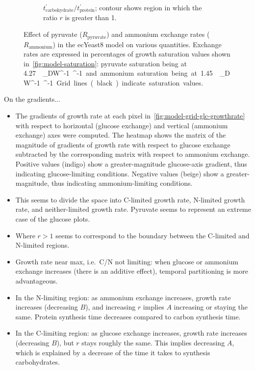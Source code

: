 \begin{figure}
\begin{subfigure}[t]{0.45\textwidth}
    \caption{
      $t_{\mathrm{carbohydrate}}^{\prime}/t_{\mathrm{protein}}^{\prime}$;
      contour shows region in which the ratio $r$ is greater than 1.
    }
    \label{fig:model-grid-pyr-carb-to-prot}
  \end{subfigure}
  \caption{
    Effect of pyruvate ($R_{\mathrm{pyruvate}}$) and ammonium exchange rates ($R_{{\mathrm{ammonium}}}$) in the ecYeast8 model on various quantities.
    Exchange rates are expressed in percentages of growth saturation values shown in~\ref{fig:model-saturation}: pyruvate saturation being at \SI{4.27}{\milli\mole~\gram_{DW}^{-1}~\hour^{-1}} and ammonium saturation being at \SI{1.45}{\milli\mole~\gram_{DW}^{-1}~\hour^{-1}}.
    Grid lines (black) indicate saturation values.
  }
  \label{fig:model-grid-pyr}
\end{figure}

On the gradients...
\begin{itemize}
  \item The gradients of growth rate at each pixel in~\ref{fig:model-grid-glc-growthrate} with respect to horizontal (glucose exchange) and vertical (ammonium exchange) axes were computed.
        The heatmap shows the matrix of the magnitude of gradients of growth rate with respect to glucose exchange subtracted by the corresponding matrix with respect to ammonium exchange.
        Positive values (indigo) show a greater-magnitude glucose-axis gradient, thus indicating glucose-limiting conditions.
        Negative values (beige) show a greater-magnitude, thus indicating ammonium-limiting conditions.
  \item This seems to divide the space into C-limited growth rate, N-limited growth rate, and neither-limited growth rate.
        Pyruvate seems to represent an extreme case of the glucose plots.
  \item Where $r > 1$ seems to correspond to the boundary between the C-limited and N-limited regions.
  \item Growth rate near max, i.e.\ C/N not limiting: when glucose or ammonium exchange increases (there is an additive effect), temporal partitioning is more advantageous.
  \item In the N-limiting region: as ammonium exchange increases, growth rate increases (decreasing $B$), and increasing $r$ implies $A$ increasing or staying the same.
        Protein synthesis time decreases compared to carbon synthesis time.
  \item In the C-limiting region: as glucose exchange increases, growth rate increases (decreasing $B$), but $r$ stays roughly the same.
        This implies decreasing $A$, which is explained by a decrease of the time it takes to synthesis carbohydrates.
\end{itemize}

